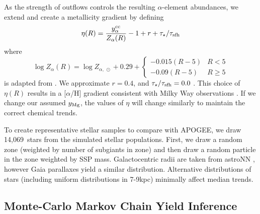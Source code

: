 \documentclass[fleqn,
usenatbib]{mnras}
\newcommand{\JJ}{\citetalias{james+21}}
\newcommand{\nsubgiants}{14,069}
\begin{document}
As the strength of outflows controls the resulting $\alpha$-element abundances, we extend \JJ and create a metallicity gradient by defining
\begin{equation}\label{eq:mass_loading}
\eta(R) = \frac{y_{\alpha}^{\rm cc}}{Z_{\alpha}(R)} -1 + r + \tau_{\star} / \tau_{\rm sfh} 
\end{equation}
where 
\begin{equation}
    \log Z_{\alpha}(R) = \log Z_{\alpha,\ \odot} + 
    0.29 + 
    \begin{cases}
        -0.015(R-5) & R < 5 \\
        -0.09(R-5) & R \geq 5
    \end{cases}
\end{equation}
is adapted from \citet{hayden+14}.  We approximate $r=0.4$, and $\tau_\star/\tau_{\rm sfh} = 0.0$ .
This choice of $\eta(R)$ results in a [$\alpha$/H] gradient consistent with Milky Way observations \citep[e.g.][]{hayden+14, weinberg+19, frinchaboy+13}.
If we change our assumed $y_{\rm Mg}$, the values of $\eta$ will change similarly to maintain the correct chemical trends.

To create representative stellar samples to compare with APOGEE, 
we draw \nsubgiants\ stars from the simulated stellar populations. First, we draw a random zone (weighted by number of subgiants in zone) and then draw a random particle in the zone weighted by SSP mass.
Galactocentric radii are taken from astroNN \citep{leung+bovy19, leung+bovy19b}, however Gaia parallaxes yield a similar distribution. Alternative distributions of stars (including uniform distributions in 7-9kpc) minimally affect median trends.

\subsection{Monte-Carlo Markov Chain Yield Inference} \label{sec:mcmc_methods}
\end{document}
